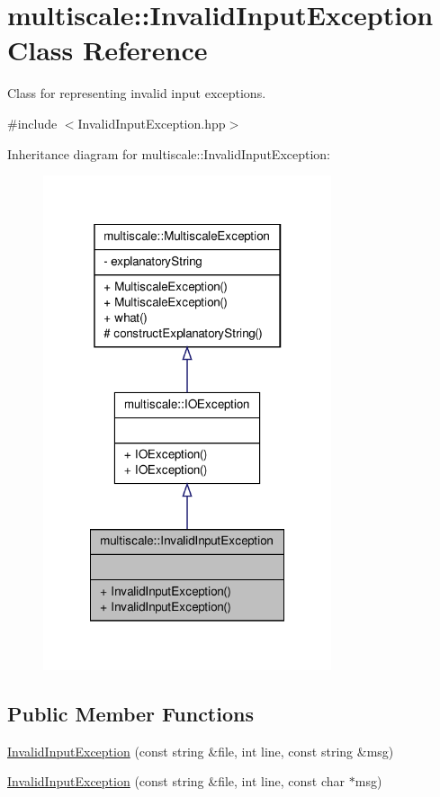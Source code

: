 \hypertarget{classmultiscale_1_1InvalidInputException}{\section{multiscale\-:\-:\-Invalid\-Input\-Exception \-Class \-Reference}
\label{classmultiscale_1_1InvalidInputException}
}


\-Class for representing invalid input exceptions.  




{\ttfamily \#include $<$\-Invalid\-Input\-Exception.\-hpp$>$}



\-Inheritance diagram for multiscale\-:\-:\-Invalid\-Input\-Exception\-:\nopagebreak
\begin{figure}[H]
\begin{center}
\leavevmode
\includegraphics[width=240pt]{classmultiscale_1_1InvalidInputException__inherit__graph}
\end{center}
\end{figure}
\subsection*{\-Public \-Member \-Functions}
\begin{DoxyCompactItemize}
\item 
\hyperlink{classmultiscale_1_1InvalidInputException_aea7260856bd45bd4443d7626de243b72}{\-Invalid\-Input\-Exception} (const string \&file, int line, const string \&msg)
\item 
\hyperlink{classmultiscale_1_1InvalidInputException_af12fa935cdc2aacbba5ea8cda0ef8df1}{\-Invalid\-Input\-Exception} (const string \&file, int line, const char $\ast$msg)
\end{DoxyCompactItemize}


